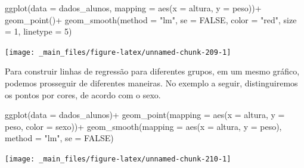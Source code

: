 \documentclass[
  brazilian,
]{book}
\newenvironment{Shaded}{\begin{snugshade}}{\end{snugshade}}
\newcommand{\AttributeTok}[1]{\textcolor[rgb]{0.77,0.63,0.00}{#1}}
\newcommand{\ConstantTok}[1]{\textcolor[rgb]{0.00,0.00,0.00}{#1}}
\newcommand{\DecValTok}[1]{\textcolor[rgb]{0.00,0.00,0.81}{#1}}
\newcommand{\FunctionTok}[1]{\textcolor[rgb]{0.00,0.00,0.00}{#1}}
\newcommand{\NormalTok}[1]{#1}
\newcommand{\SpecialCharTok}[1]{\textcolor[rgb]{0.00,0.00,0.00}{#1}}
\newcommand{\StringTok}[1]{\textcolor[rgb]{0.31,0.60,0.02}{#1}}
\begin{document}
\begin{Shaded}
\begin{Highlighting}[]
\FunctionTok{ggplot}\NormalTok{(}\AttributeTok{data =}\NormalTok{ dados\_alunos,}
       \AttributeTok{mapping =} \FunctionTok{aes}\NormalTok{(}\AttributeTok{x =}\NormalTok{ altura,}
                     \AttributeTok{y =}\NormalTok{ peso))}\SpecialCharTok{+}
  \FunctionTok{geom\_point}\NormalTok{()}\SpecialCharTok{+}
  \FunctionTok{geom\_smooth}\NormalTok{(}\AttributeTok{method =} \StringTok{"lm"}\NormalTok{,}
              \AttributeTok{se =} \ConstantTok{FALSE}\NormalTok{,}
              \AttributeTok{color =} \StringTok{"red"}\NormalTok{,}
              \AttributeTok{size =} \DecValTok{1}\NormalTok{,}
              \AttributeTok{linetype =} \DecValTok{5}\NormalTok{)}
\end{Highlighting}
\end{Shaded}

\begin{center}\texttt{[image: \_main\_files/figure-latex/unnamed-chunk-209-1]} \end{center}

Para construir linhas de regressão para diferentes grupos, em um mesmo gráfico, podemos prosseguir de diferentes maneiras. No exemplo a seguir, distinguiremos os pontos por cores, de acordo com o sexo.

\begin{Shaded}
\begin{Highlighting}[]
\FunctionTok{ggplot}\NormalTok{(}\AttributeTok{data =}\NormalTok{ dados\_alunos)}\SpecialCharTok{+}
  \FunctionTok{geom\_point}\NormalTok{(}\AttributeTok{mapping =} \FunctionTok{aes}\NormalTok{(}\AttributeTok{x =}\NormalTok{ altura,}
                           \AttributeTok{y =}\NormalTok{ peso,}
                           \AttributeTok{color =}\NormalTok{ sexo))}\SpecialCharTok{+}
  \FunctionTok{geom\_smooth}\NormalTok{(}\AttributeTok{mapping =} \FunctionTok{aes}\NormalTok{(}\AttributeTok{x =}\NormalTok{ altura,}
                            \AttributeTok{y =}\NormalTok{ peso),}
              \AttributeTok{method =} \StringTok{"lm"}\NormalTok{,}
              \AttributeTok{se =} \ConstantTok{FALSE}\NormalTok{)}
\end{Highlighting}
\end{Shaded}

\begin{center}\texttt{[image: \_main\_files/figure-latex/unnamed-chunk-210-1]} \end{center}
\end{document}

